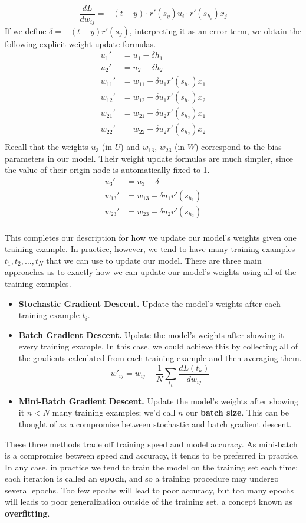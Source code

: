 \documentclass[12pt,letterpaper]{book}
\theoremstyle{definition}
\begin{document}
  \[
    \frac{dL}{dw_{ij}}= -(t - y) \cdot r'(s_y)u_i \cdot r'(s_{h_i})x_j
  \]
  If we define $\delta = -(t - y)r'(s_y)$, interpreting it as an error term,
  we obtain the following explicit weight update formulas.
  \begin{align}
    u_1' &= u_1 - \delta h_1\\
    u_2' &= u_2 - \delta h_2\\
    w_{11}' &= w_{11} - \delta u_1r'(s_{h_1})x_1\\
    w_{12}' &= w_{12} - \delta u_1r'(s_{h_1})x_2\\
    w_{21}' &= w_{21} - \delta u_2r'(s_{h_2})x_1\\
    w_{22}' &= w_{22} - \delta u_2r'(s_{h_2})x_2\\
  \end{align}
  Recall that the weights $u_3$ (in $U$) and $w_{13}$, $w_{23}$ (in $W$) 
  correspond to the bias parameters in our model. Their weight update formulas are much simpler, 
  since the value of their origin node is automatically fixed to 1.
  \begin{align}
    u_3' &= u_3 - \delta \\
    w_{13}' &= w_{13} - \delta u_1r'(s_{h_1})\\
    w_{23}' &= w_{23} - \delta u_2r'(s_{h_2})\\
  \end{align}

  This completes our description for how we update our model's weights given 
  one training example. In practice, however, we tend to have many training examples 
  $t_1, t_2, \dots, t_N$ that we can use to update our model. 
  There are three main approaches as to exactly how we can update our 
  model's weights using all of the training examples.
  \begin{itemize}
    \item \textbf{Stochastic Gradient Descent.} Update the model's weights after each training example $t_i$.
    \item\textbf{Batch Gradient Descent.} Update the model's weights after showing it every training example. 
    In this case, we could achieve this by collecting all of the gradients calculated from each 
    training example and then averaging them.
    \[
      w'_{ij}  = w_{ij} - \frac{1}{N} \sum_{t_k}\frac{dL(t_k)}{dw_{ij}}
    \]
    \item\textbf{Mini-Batch Gradient Descent.} Update the model's weights after showing it $n < N$ many training 
    examples; we'd call $n$ our \textbf{batch size}. 
    This can be thought of as a compromise between stochastic and batch gradient descent. 
  \end{itemize}
  These three methods trade off training speed and model accuracy. As mini-batch is a compromise 
  between speed and accuracy, it tends to be preferred in practice. In any case, 
  in practice we tend to train the model on the training set each time; each iteration is 
  called an \textbf{epoch}, and so a training procedure may undergo several epochs.
  Too few epochs will lead to poor accuracy, but too many epochs will leads to 
  poor generalization outside of the training set, a concept known as \textbf{overfitting}.
\end{document}
